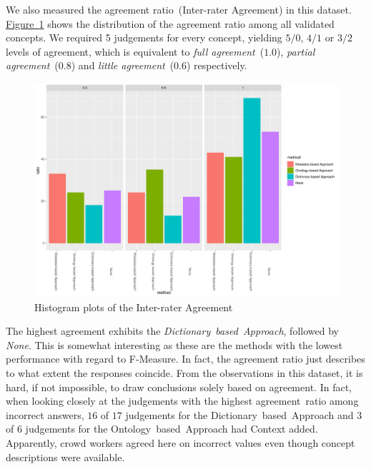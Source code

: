 We also measured the agreement ratio~(Inter-rater Agreement) in this dataset. \hyperref[fig:hist_agreement_climate_change_all]{Figure~\ref*{fig:hist_agreement_climate_change_all}} shows the distribution of the agreement ratio among all validated concepts. We required 5 judgements for every concept, yielding $5/0$, $4/1$ or $3/2$ levels of agreement, which is equivalent to
\emph{full agreement}~($1.0$), \emph{partial agreement}~($0.8$) and \emph{little agreement}~($0.6$) respectively. 
\begin{figure}
  	 \includegraphics[width=\textwidth]{plots/climate_change/hist_agreement_corrected}
  	 \caption{Histogram plots of the Inter-rater Agreement}\label{fig:hist_agreement_climate_change_all}
\end{figure}

The highest agreement exhibits the \emph{Dictionary~based~Approach}, followed by \emph{None}. This is somewhat interesting as these are the methods with the lowest performance with regard to F-Measure. In fact, the agreement ratio just describes to what extent the responses coincide. From the observations in this dataset, it is hard, if not impossible, to draw conclusions solely based on agreement. In fact, when looking closely at the judgements with the highest agreement~ratio among incorrect answers, $16$ of $17$ judgements for the Dictionary~based~Approach and $3$ of $6$ judgements for the Ontology~based~Approach had Context added. Apparently, crowd workers agreed here on incorrect values even though concept descriptions were available. 

